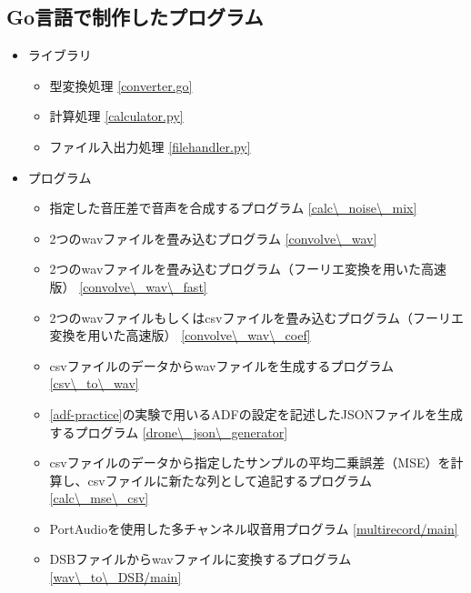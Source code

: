 \subsection{Go言語で制作したプログラム}\label{go}

\begin{itemize}
\tightlist

\item
  ライブラリ \\
  \begin{itemize}
  \tightlist
  \item
    型変換処理 \ref{converter.go}

  \item
    計算処理  \ref{calculator.py}

  \item
    ファイル入出力処理 \ref{filehandler.py}
  \end{itemize}

\item
  プログラム

  \begin{itemize}

  \item
    指定した音圧差で音声を合成するプログラム \ref{calc\_noise\_mix}

  \item
    2つのwavファイルを畳み込むプログラム \ref{convolve\_wav}

  \item
    2つのwavファイルを畳み込むプログラム（フーリエ変換を用いた高速版） \ref{convolve\_wav\_fast}

  \item
    2つのwavファイルもしくはcsvファイルを畳み込むプログラム（フーリエ変換を用いた高速版） \ref{convolve\_wav\_coef}

  \item
    csvファイルのデータからwavファイルを生成するプログラム \ref{csv\_to\_wav}

  \item
    \ref{adf-practice}の実験で用いるADFの設定を記述したJSONファイルを生成するプログラム \ref{drone\_json\_generator}

  \item
    csvファイルのデータから指定したサンプルの平均二乗誤差（MSE）を計算し、csvファイルに新たな列として追記するプログラム \ref{calc\_mse\_csv}

  \item
    PortAudioを使用した多チャンネル収音用プログラム \ref{multirecord/main}

  \item
    DSBファイルからwavファイルに変換するプログラム \ref{wav\_to\_DSB/main}
  \end{itemize}
\end{itemize}

